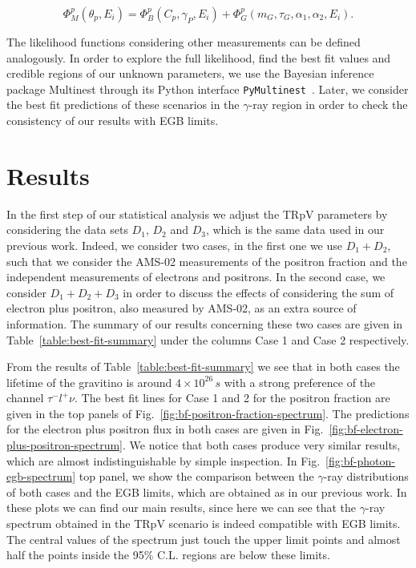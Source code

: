 \documentclass[a4paper,11pt]{article}
\begin{document}
\begin{equation}
\Phi_M^p(\theta_p,E_i ) = \Phi_B^p(C_p, \gamma_P, E_i) + \Phi_{G}^{p}(m_G, \tau_G, \alpha_1, \alpha_2, E_i).
\end{equation}

The likelihood functions considering other measurements can be defined analogously. In order to explore the full likelihood, find the best fit values and credible regions of our unknown parameters, we use the Bayesian inference package Multinest \cite{Feroz:2008xx} through its Python interface \verb|PyMultinest|~\cite{Buchner:2014nha}. Later, we consider the best fit predictions of these scenarios in the $\gamma$-ray region in order to check the consistency of our results with EGB limits.

\section{Results}
\label{sec:results}

In the first step of our statistical analysis we adjust the TRpV parameters by considering the data sets $D_1$, $D_2$ and $D_3$, which is the same data used in our previous work. Indeed, we consider two cases, in the first one we use $D_1+D_2$, such that we consider the AMS-02 measurements of the positron fraction and the independent measurements of electrons and positrons. In the second case, we consider $D_1+D_2+D_3$ in order to discuss the effects of considering the sum of electron plus positron, also measured by AMS-02, as an extra source of information. The summary of our results concerning these two cases are given in Table~\ref{table:best-fit-summary} under the columns Case 1 and Case 2 respectively. 

From the results of Table~\ref{table:best-fit-summary} we see that in both cases the lifetime of the gravitino is around $4\times10^{26}\,s$ with a strong preference of the channel $\tau^{-}l^{+}\nu$. The best fit lines for Case 1 and 2 for the positron fraction are given in the top panels of Fig.~\ref{fig:bf-positron-fraction-spectrum}. The predictions for the electron plus positron flux in both cases are given in Fig.~\ref{fig:bf-electron-plus-positron-spectrum}. We notice that both cases produce very similar results, which are almost indistinguishable by simple inspection. In Fig.~\ref{fig:bf-photon-egb-spectrum} top panel, we show the comparison between the $\gamma$-ray distributions of both cases and the EGB limits, which are obtained as in our previous work. In these plots we can find our main results, since here we can see that the $\gamma$-ray spectrum obtained in the TRpV scenario is indeed compatible with EGB limits. The central values of the spectrum just touch the upper limit points and almost half the points inside the 95\% C.L. regions are below these limits.
\end{document}

